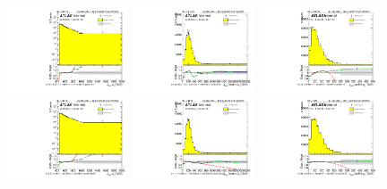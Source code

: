\begin{figure}[htbp!]
\begin{center}
\includegraphics[angle=270, width=0.32\textwidth]{./figures/boosted/Reweight/Fits/Moriond_NoTag_3Trk_subl_Incl_leadHCand_Pt_m_1.pdf}
\includegraphics[angle=270, width=0.32\textwidth]{./figures/boosted/Reweight/Fits/Moriond_NoTag_3Trk_subl_Incl_leadHCand_trk0_Pt.pdf}
\includegraphics[angle=270, width=0.32\textwidth]{./figures/boosted/Reweight/Fits/Moriond_NoTag_3Trk_subl_Incl_leadHCand_trk1_Pt.pdf} \\
\includegraphics[angle=270, width=0.32\textwidth]{./figures/boosted/Reweight/Fits/Moriond_bkg_0_NoTag_3Trk_subl_Incl_leadHCand_Pt_m_1.pdf}
\includegraphics[angle=270, width=0.32\textwidth]{./figures/boosted/Reweight/Fits/Moriond_bkg_0_NoTag_3Trk_subl_Incl_leadHCand_trk0_Pt.pdf}
\includegraphics[angle=270, width=0.32\textwidth]{./figures/boosted/Reweight/Fits/Moriond_bkg_0_NoTag_3Trk_subl_Incl_leadHCand_trk1_Pt.pdf} \\

\end{center}
\end{figure}
